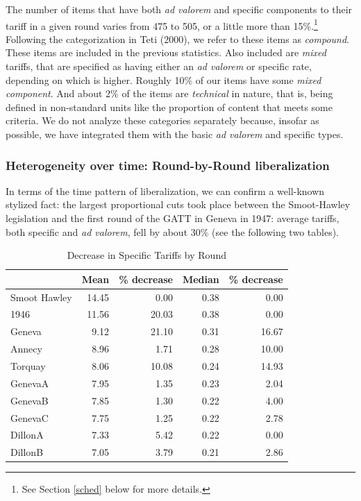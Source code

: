 \documentclass[
  12pt,
]{article}
\begin{document}
The number of items that have both \emph{ad valorem} and specific components to their tariff in a given round varies from 475 to 505, or a little more than 15\%.\footnote{See Section \ref{sched} below for more details.} Following the categorization in Teti (2000), we refer to these items as \emph{compound}. These items are included in the previous statistics. Also included are \emph{mixed} tariffs, that are specified as having either an \emph{ad valorem} or specific rate, depending on which is higher. Roughly 10\% of our items have some \emph{mixed component}. And about 2\% of the items are \emph{technical} in nature, that is, being defined in non-standard units like the proportion of content that meets some criteria. We do not analyze these categories separately because, insofar as possible, we have integrated them with the basic \emph{ad valorem} and specific types.

\hypertarget{heterogeneity-over-time-round-by-round-liberalization}{%
\subsubsection{Heterogeneity over time: Round-by-Round liberalization}\label{heterogeneity-over-time-round-by-round-liberalization}}

In terms of the time pattern of liberalization, we can confirm a well-known stylized fact: the largest proportional cuts took place between the Smoot-Hawley legislation and the first round of the GATT in Geneva in 1947: average tariffs, both specific and \emph{ad valorem}, fell by about 30\% (see the following two tables).

\begin{table}[!h]

\caption{\label{tab:sp-rd}Decrease in Specific Tariffs by Round}
\centering
\begin{tabular}[t]{lrrrr}
\toprule
  & Mean & \% decrease & Median & \% decrease\\
\midrule
Smoot Hawley & 14.45 & 0.00 & 0.38 & 0.00\\
1946 & 11.56 & 20.03 & 0.38 & 0.00\\
Geneva & 9.12 & 21.10 & 0.31 & 16.67\\
Annecy & 8.96 & 1.71 & 0.28 & 10.00\\
Torquay & 8.06 & 10.08 & 0.24 & 14.93\\
\addlinespace
GenevaA & 7.95 & 1.35 & 0.23 & 2.04\\
GenevaB & 7.85 & 1.30 & 0.22 & 4.00\\
GenevaC & 7.75 & 1.25 & 0.22 & 2.78\\
DillonA & 7.33 & 5.42 & 0.22 & 0.00\\
DillonB & 7.05 & 3.79 & 0.21 & 2.86\\
\bottomrule
\end{tabular}
\end{table}
\end{document}
